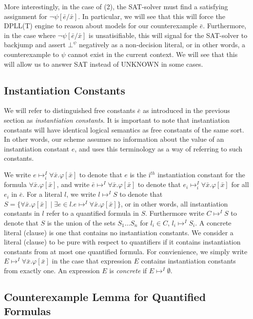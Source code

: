 \documentclass{llncs}
\begin{document}
More interestingly, in the case of (2), the SAT-solver must find a satisfying assignment for $\neg \psi[\bar{e}/\bar{x}]$.
In particular, we will see that this will force the DPLL(T) engine to reason about models for our counterexample $\bar{e}$.
Furthermore, in the case where $\neg \psi[\bar{e}/\bar{x}]$ is unsatisifiable, this will signal for the SAT-solver to backjump and assert $\bot^\psi$ negatively as a non-decision literal, or in other words, a counterexample to $\psi$ cannot exist in the current context.
We will see that this will allow us to answer SAT instead of UNKNOWN in some cases.

\subsection{Instantiation Constants}

We will refer to distinguished free constants $\bar{e}$ as introduced in the previous section as \emph{instantiation constants}.
It is important to note that instantiation constants will have identical logical semantics as free constants of the same sort.
In other words, our scheme assumes no information about the value of an instantiation constant $e$, and uses this terminology as a way of referring to such constants.

We write $e \mapsto^I_i \forall \bar{x}. \varphi[ \bar{x} ]$ to denote that $e$ is the i$^{th}$ instantiation constant for the formula $\forall \bar{x}. \varphi[ \bar{x} ] $, and write $\bar{e} \mapsto^I \forall \bar{x}. \varphi[ \bar{x} ]$ to denote that $e_i \mapsto^I_i \forall \bar{x}. \varphi[ \bar{x} ]$ for all $e_i$ in $\bar{e}$.
For a literal $l$, we write $l \mapsto^I S$ to denote that $S = \{ \forall \bar{x}. \varphi[ \bar{x} ] \mid \exists e \in l. e \mapsto^I \forall \bar{x}. \varphi[ \bar{x} ] \}$, or in other words, all instantiation constants in $l$ refer to a quantified formula in $S$.
Furthermore write $C \mapsto^I S$ to denote that $S$ is the union of the sets $S_1 \ldots S_n$ for $l_i \in C$, $l_i \mapsto^I S_i$.
A concrete literal (clause) is one that contains no instantiation constants.
We consider a literal (clause) to be pure with respect to quantifiers if it contains instantiation constants from at most one quantified formula.
For convienience, we simply write $E \mapsto^I \forall \bar{x}. \varphi[ \bar{x} ]$ in the case that expression $E$ contains instantiation constants from exactly one.
An expression $E$ is \emph{concrete} if $E \mapsto^I \emptyset$.

\subsection{Counterexample Lemma for Quantified Formulas}
\end{document}
